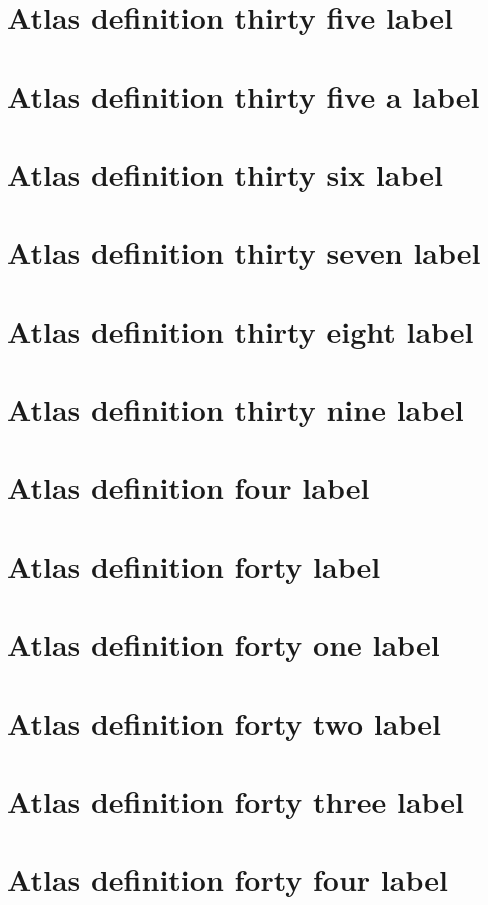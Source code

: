 \documentclass[11pt]{article}
\theoremstyle{definition}
\begin{document}
\section{Atlas definition thirty five label}
\label{ll:labels:atlas-d35}
\section{Atlas definition thirty five a label}
\label{ll:labels:atlas-d35a}
\section{Atlas definition thirty six label}
\label{ll:labels:atlas-d36}
\section{Atlas definition thirty seven label}
\label{ll:labels:atlas-d37}
\section{Atlas definition thirty eight label}
\label{ll:labels:atlas-d38}
\section{Atlas definition thirty nine label}
\label{ll:labels:atlas-d39}
\section{Atlas definition four label}
\label{ll:labels:atlas-d4}
\section{Atlas definition forty label}
\label{ll:labels:atlas-d40}
\section{Atlas definition forty one label}
\label{ll:labels:atlas-d41}
\section{Atlas definition forty two label}
\label{ll:labels:atlas-d42}
\section{Atlas definition forty three label}
\label{ll:labels:atlas-d43}
\section{Atlas definition forty four label}
\label{ll:labels:atlas-d44}
\end{document}
